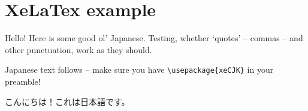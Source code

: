\section{XeLaTex example}

Hello! Here is some good ol' Japanese. Testing, whether `quotes' -- commas --
and other punctuation, work as they should.

Japanese text follows -- make sure you have \verb$\usepackage{xeCJK}$ in your
preamble!

こんにちは！これは日本語です。
